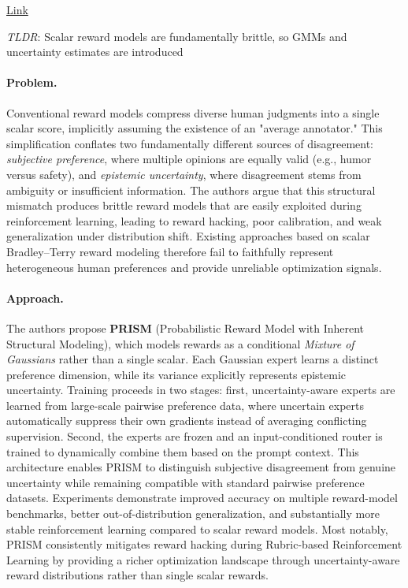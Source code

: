 \documentclass[11pt]{article}
\begin{document}
\href{https://aclanthology.org/2026.acl-long.563.pdf}{Link}

\emph{TLDR}: Scalar reward models are fundamentally brittle, so GMMs and uncertainty estimates are introduced

\paragraph{Problem.}
Conventional reward models compress diverse human judgments into a single scalar score, implicitly assuming the existence of an "average annotator." This simplification conflates two fundamentally different sources of disagreement: \emph{subjective preference}, where multiple opinions are equally valid (e.g., humor versus safety), and \emph{epistemic uncertainty}, where disagreement stems from ambiguity or insufficient information. The authors argue that this structural mismatch produces brittle reward models that are easily exploited during reinforcement learning, leading to reward hacking, poor calibration, and weak generalization under distribution shift. Existing approaches based on scalar Bradley--Terry reward modeling therefore fail to faithfully represent heterogeneous human preferences and provide unreliable optimization signals.  

\paragraph{Approach.}
The authors propose \textbf{PRISM} (Probabilistic Reward Model with Inherent Structural Modeling), which models rewards as a conditional \emph{Mixture of Gaussians} rather than a single scalar. Each Gaussian expert learns a distinct preference dimension, while its variance explicitly represents epistemic uncertainty. Training proceeds in two stages: first, uncertainty-aware experts are learned from large-scale pairwise preference data, where uncertain experts automatically suppress their own gradients instead of averaging conflicting supervision. Second, the experts are frozen and an input-conditioned router is trained to dynamically combine them based on the prompt context. This architecture enables PRISM to distinguish subjective disagreement from genuine uncertainty while remaining compatible with standard pairwise preference datasets. Experiments demonstrate improved accuracy on multiple reward-model benchmarks, better out-of-distribution generalization, and substantially more stable reinforcement learning compared to scalar reward models. Most notably, PRISM consistently mitigates reward hacking during Rubric-based Reinforcement Learning by providing a richer optimization landscape through uncertainty-aware reward distributions rather than single scalar rewards.  
\end{document}
